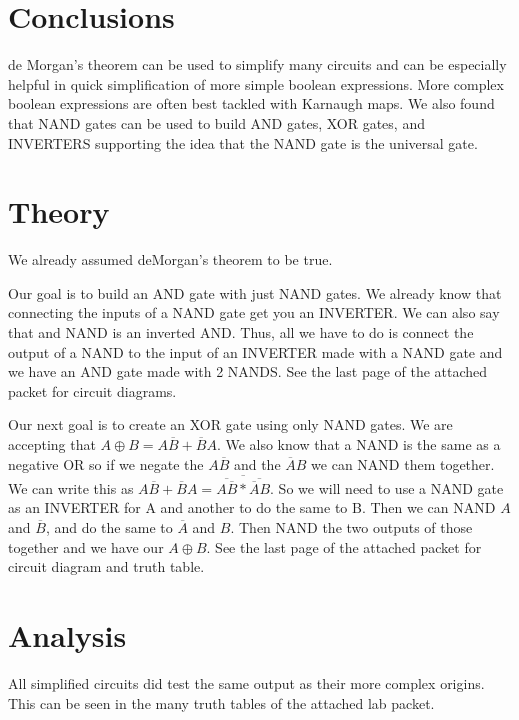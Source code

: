 \documentclass[prb,preprint]{revtex4-1}
\begin{document}
\section{Conclusions}
de Morgan's theorem can be used to simplify many circuits and can be especially helpful in quick simplification of more simple boolean expressions. More complex boolean expressions are often best tackled with Karnaugh maps. We also found that NAND gates can be used to build AND gates, XOR gates, and INVERTERS supporting the idea that the NAND gate is the universal gate.

\section{Theory}
We already assumed deMorgan's theorem to be true.

Our goal is to build an AND gate with just NAND gates. We already know that connecting the inputs of a NAND gate get you an INVERTER. We can also say that and NAND is an inverted AND. Thus, all we have to do is connect the output of a NAND to the input of an INVERTER made with a NAND gate and we have an AND gate made with 2 NANDS. See the last page of the attached packet for circuit diagrams.

Our next goal is to create an XOR gate using only NAND gates. We are accepting that $A \oplus B = A\overline{B}+\overline{B}A$. We also know that a NAND is the same as a negative OR so if we negate the $A\overline{B}$ and the $\overline{A}B$ we can NAND them together. We can write this as $A\overline{B}+\overline{B}A = \overline{ \overline{A\overline{B}}*\overline{\overline{A}B}}$. So we will need to use a NAND gate as an INVERTER for A and another to do the same to B. Then we can NAND $A$ and $\overline{B}$, and do the same to $\overline{A}$ and $B$. Then NAND the two outputs of those together and we have our $A \oplus B$. See the last page of the attached packet for circuit diagram and truth table.

\section{Analysis}
All simplified circuits did test the same output as their more complex origins. This can be seen in the many truth tables of the attached lab packet.

\end{document}
